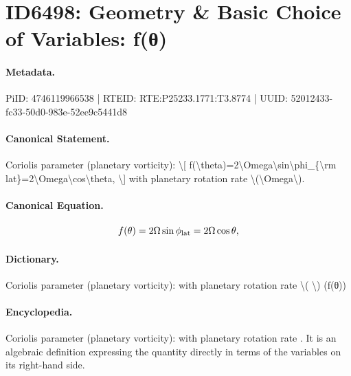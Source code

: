 \section*{ID6498: Geometry \& Basic Choice of Variables: f(θ)}
\paragraph{Metadata.}
PiID: 4746119966538 | RTEID: RTE:P25233.1771:T3.8774 | UUID: 52012433-fc33-50d0-983e-52ee9c5441d8

\paragraph{Canonical Statement.}
Coriolis parameter (planetary vorticity): \textbackslash{}[ f(\textbackslash{}theta)=2\textbackslash{}Omega\textbackslash{}sin\textbackslash{}phi\_\{\textbackslash{}rm lat\}=2\textbackslash{}Omega\textbackslash{}cos\textbackslash{}theta, \textbackslash{}] with planetary rotation rate \textbackslash{}(\textbackslash{}Omega\textbackslash{}).

\paragraph{Canonical Equation.}
\[
f(\theta)=2\Omega\sin\phi_{\rm lat}=2\Omega\cos\theta,
\]

\paragraph{Dictionary.}
Coriolis parameter (planetary vorticity): with planetary rotation rate \textbackslash{}( \textbackslash{}) (f(θ))

\paragraph{Encyclopedia.}
Coriolis parameter (planetary vorticity): with planetary rotation rate . It is an algebraic definition expressing the quantity directly in terms of the variables on its right-hand side.
